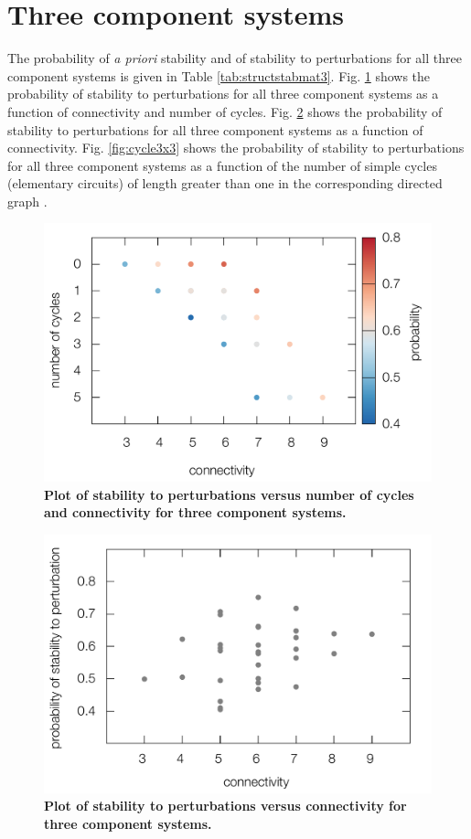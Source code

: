 \documentclass{amsart}
\theoremstyle{definition}
\theoremstyle{remark}
\numberwithin{equation}{section}
\begin{document}
\section{Three component systems}

The probability of \emph{a priori} stability and of stability to perturbations for all three component systems is given in Table \ref{tab:structstabmat3}. Fig. \ref{fig:connectcycle3D3x3} shows the probability of stability to perturbations for all three component systems as a function of connectivity and number of cycles. Fig. \ref{fig:stab3x3} shows the probability of stability to perturbations for all three component systems as a function of connectivity. Fig. \ref{fig:cycle3x3} shows the probability of stability to perturbations for all three component systems as a function of the number of simple cycles (elementary circuits) of length greater than one in the corresponding directed graph \cite{Johnson1975}.

\begin{figure}[!ht]
\centering
\noindent\includegraphics[width=0.8\columnwidth]{fig/connectcycle3D3x3.pdf}
\caption{{\bf Plot of stability to perturbations versus number of cycles and connectivity for three component systems.} }
\label{fig:connectcycle3D3x3}
\end{figure}

\begin{figure}[!ht]
\centering
\noindent\includegraphics[width=0.8\columnwidth]{fig/stab3x3.pdf}
\caption{{\bf Plot of stability to perturbations versus connectivity for three component systems.} }
\label{fig:stab3x3}
\end{figure}
\end{document}
